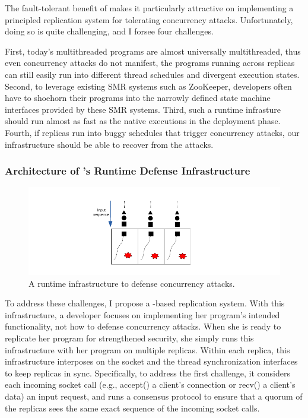 The fault-tolerant benefit of \smr makes it particularly attractive
on implementing a principled replication system for tolerating concurrency 
attacks. Unfortunately, doing so is quite challenging, and I forsee four 
challenges.

First, today’s multithreaded programs are almost universally
multithreaded, thus even concurrency attacks do not manifest, the programs 
running across replicas can still easily run into different thread schedules 
and divergent execution states. Second, to leverage existing SMR systems such 
as ZooKeeper, developers often have to shoehorn their programs into the 
narrowly defined state machine interfaces provided by these SMR systems. Third, 
such a runtime infrasture should run almost as fast as the native executions in 
the deployment phase. Fourth, if replicas run into buggy schedules that trigger 
concurrency attacks, our infrastructure should be able to recover from the 
attacks.

\subsubsection{Architecture of \xxx's Runtime Defense Infrastructure} 
\label{sec:defense-arch}

\begin{figure}[t]
\centering
\includegraphics[width=0.3\columnwidth]{figures/defense}
\vspace{-.05in}
\caption{{A runtime infrastructure to defense concurrency attacks.}} 
\label{fig:defense}
\vspace{-.05in}
\end{figure}

To address these challenges, I propose a \smr-based replication 
system. With this infrastructure, a developer focuses on implementing her 
program’s intended functionality, not how to defense concurrency attacks. When 
she is ready to replicate her program for strengthened security, she simply
runs this infrastructure with her program on multiple replicas. Within
each replica, this infrastructure interposes on the socket and the thread
synchronization interfaces to keep replicas in sync. Specifically, to address 
the first challenge, it considers each incoming socket call (e.g., accept() a 
client’s connection or recv() a client’s data) an input request, and runs a 
\paxos consensus protocol to ensure that a quorum of the replicas sees the same 
exact sequence of the incoming socket calls.

